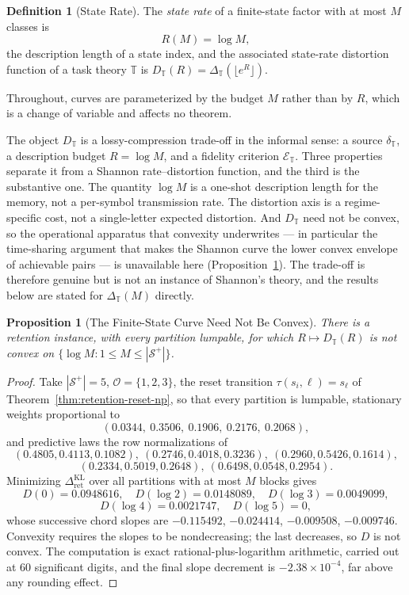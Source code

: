 \documentclass[12pt]{article}
\newtheorem{proposition}[theorem]{Proposition}
\theoremstyle{definition}
\newtheorem{definition}[theorem]{Definition}
\newcommand{\RetKL}{\Delta_{\mathrm{ret}}^{\mathrm{KL}}}
\newcommand{\Splus}{\mathcal S^{+}}
\begin{document}
\begin{definition}[State Rate]
\label{def:state-rate}
The \emph{state rate} of a finite-state factor with at most $M$ classes is
\[
R(M)=\log M ,
\]
the description length of a state index, and the associated
state-rate distortion function of a task theory $\mathbb T$ is
$D_{\mathbb T}(R)=\Delta_{\mathbb T}(\lfloor e^{R}\rfloor)$.

Throughout, curves are parameterized by the budget $M$ rather than by $R$,
which is a change of variable and affects no theorem.

The object $D_{\mathbb T}$ is a lossy-compression trade-off in the informal
sense: a source $\delta_{\mathbb T}$, a description budget $R=\log M$, and a
fidelity criterion $\mathcal E_{\mathbb T}$.  Three properties separate it
from a Shannon rate--distortion function, and the third is the substantive one.
The quantity $\log M$ is a one-shot description length for the memory, not a
per-symbol transmission rate.  The distortion axis is a regime-specific cost,
not a single-letter expected distortion.  And $D_{\mathbb T}$ need not be
convex, so the operational apparatus that convexity underwrites --- in
particular the time-sharing argument that makes the Shannon curve the lower
convex envelope of achievable pairs --- is unavailable here
(Proposition~\ref{prop:rd-nonconvex}).  The trade-off is therefore genuine but
is not an instance of Shannon's theory, and the results below are stated for
$\Delta_{\mathbb T}(M)$ directly.
\end{definition}

\begin{proposition}[The Finite-State Curve Need Not Be Convex]
\label{prop:rd-nonconvex}
There is a retention instance, with every partition lumpable, for which
$R\mapsto D_{\mathbb T}(R)$ is not convex on $\{\log M:1\le M\le|\Splus|\}$.
\end{proposition}

\begin{proof}
Take $|\Splus|=5$, $\mathcal O=\{1,2,3\}$, the reset transition
$\tau(s_i,\ell)=s_\ell$ of Theorem~\ref{thm:retention-reset-np}, so that every
partition is lumpable, stationary weights proportional to
\[
(0.0344,\ 0.3506,\ 0.1906,\ 0.2176,\ 0.2068),
\]
and predictive laws the row normalizations of
\[
(0.4805,0.4113,0.1082),\ (0.2746,0.4018,0.3236),\ (0.2960,0.5426,0.1614),
\]
\[
(0.2334,0.5019,0.2648),\ (0.6498,0.0548,0.2954).
\]
Minimizing $\RetKL$ over all partitions with at most $M$ blocks gives
\[
D(0)=0.0948616,\quad
D(\log2)=0.0148089,\quad
D(\log3)=0.0049099,
\]
\[
D(\log4)=0.0021747,\quad
D(\log5)=0 ,
\]
whose successive chord slopes are
$-0.115492$, $-0.024414$, $-0.009508$, $-0.009746$.  Convexity requires the
slopes to be nondecreasing; the last decreases, so $D$ is not convex.  The
computation is exact rational-plus-logarithm arithmetic, carried out at $60$
significant digits, and the final slope decrement is $-2.38\times10^{-4}$,
far above any rounding effect.
\end{proof}
\end{document}

